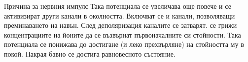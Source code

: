 \begin{frame}[t]{Причина за нервния импулс}
  Така потенциала се увеличава още повече и се активизират други канали в околността. 
  Включват се и канали, позволяващи преминаването на  навън.
  След деполяризация каналите се затварят. 
   се грижи концентрациите на йоните да се възвърнат първоначалните си стойности. 
  Така потенциала се понижава до достигане (и леко прехвърляне) на стойността му в покой.
  Накрая бавно се достига равновесното състояние.
\end{frame}